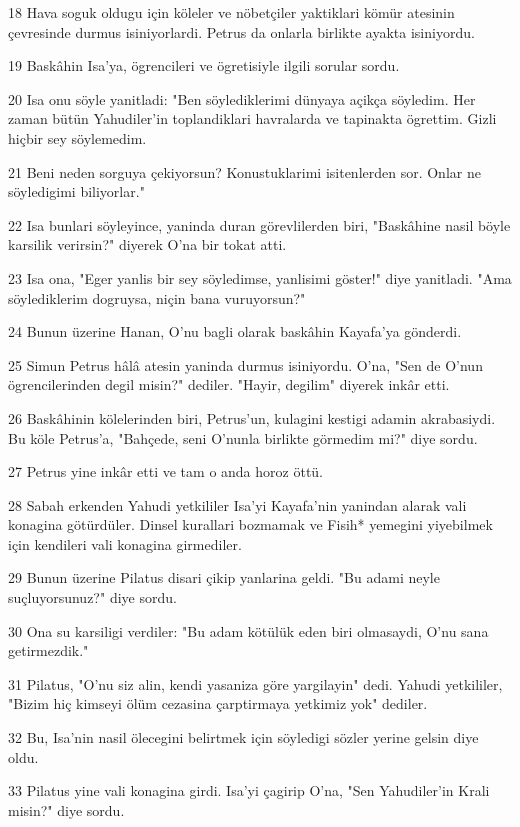 \par 18 Hava soguk oldugu için köleler ve nöbetçiler yaktiklari kömür atesinin çevresinde durmus isiniyorlardi. Petrus da onlarla birlikte ayakta isiniyordu.
\par 19 Baskâhin Isa'ya, ögrencileri ve ögretisiyle ilgili sorular sordu.
\par 20 Isa onu söyle yanitladi: "Ben söylediklerimi dünyaya açikça söyledim. Her zaman bütün Yahudiler'in toplandiklari havralarda ve tapinakta ögrettim. Gizli hiçbir sey söylemedim.
\par 21 Beni neden sorguya çekiyorsun? Konustuklarimi isitenlerden sor. Onlar ne söyledigimi biliyorlar."
\par 22 Isa bunlari söyleyince, yaninda duran görevlilerden biri, "Baskâhine nasil böyle karsilik verirsin?" diyerek O'na bir tokat atti.
\par 23 Isa ona, "Eger yanlis bir sey söyledimse, yanlisimi göster!" diye yanitladi. "Ama söylediklerim dogruysa, niçin bana vuruyorsun?"
\par 24 Bunun üzerine Hanan, O'nu bagli olarak baskâhin Kayafa'ya gönderdi.
\par 25 Simun Petrus hâlâ atesin yaninda durmus isiniyordu. O'na, "Sen de O'nun ögrencilerinden degil misin?" dediler. "Hayir, degilim" diyerek inkâr etti.
\par 26 Baskâhinin kölelerinden biri, Petrus'un, kulagini kestigi adamin akrabasiydi. Bu köle Petrus'a, "Bahçede, seni O'nunla birlikte görmedim mi?" diye sordu.
\par 27 Petrus yine inkâr etti ve tam o anda horoz öttü.
\par 28 Sabah erkenden Yahudi yetkililer Isa'yi Kayafa'nin yanindan alarak vali konagina götürdüler. Dinsel kurallari bozmamak ve Fisih* yemegini yiyebilmek için kendileri vali konagina girmediler.
\par 29 Bunun üzerine Pilatus disari çikip yanlarina geldi. "Bu adami neyle suçluyorsunuz?" diye sordu.
\par 30 Ona su karsiligi verdiler: "Bu adam kötülük eden biri olmasaydi, O'nu sana getirmezdik."
\par 31 Pilatus, "O'nu siz alin, kendi yasaniza göre yargilayin" dedi. Yahudi yetkililer, "Bizim hiç kimseyi ölüm cezasina çarptirmaya yetkimiz yok" dediler.
\par 32 Bu, Isa'nin nasil ölecegini belirtmek için söyledigi sözler yerine gelsin diye oldu.
\par 33 Pilatus yine vali konagina girdi. Isa'yi çagirip O'na, "Sen Yahudiler'in Krali misin?" diye sordu.
